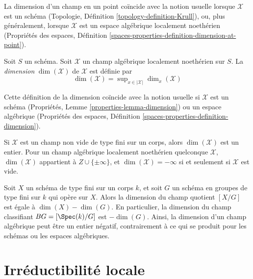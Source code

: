 \noindent
La dimension d'un champ en un point coïncide avec la notion usuelle
lorsque $\mathcal{X}$ est un schéma (Topologie, Définition
\ref{topology-definition-Krull}),
ou, plus généralement, lorsque $\mathcal{X}$ est un espace algébrique localement noethérien
(Propriétés des espaces, Définition
\ref{spaces-properties-definition-dimension-at-point}).

\begin{definition}
\label{definition-dimension}
Soit $S$ un schéma. Soit $\mathcal{X}$
un champ algébrique localement noethérien sur $S$.
La {\it dimension} $\dim(\mathcal{X})$ de $\mathcal{X}$ est définie par
$$
\dim(\mathcal{X}) = \sup\nolimits_{x \in |\mathcal{X}|} \dim_x(\mathcal{X})
$$
\end{definition}

\noindent
Cette définition de la dimension coïncide avec la notion usuelle
si $\mathcal{X}$ est un schéma
(Propriétés, Lemme \ref{properties-lemma-dimension})
ou un espace algébrique (Propriétés des espaces, Définition
\ref{spaces-properties-definition-dimension}).

\begin{remark}
\label{remark-dimension-empty-stack}
Si $\mathcal{X}$ est un champ non vide de type fini sur un corps,
alors $\dim(\mathcal{X})$ est un entier. Pour un champ algébrique
localement noethérien quelconque $\mathcal{X}$,
$\dim(\mathcal{X})$ appartient à $Z\cup \{\pm \infty\}$,
et $\dim(\mathcal{X}) = -\infty$ si et seulement si $\mathcal{X}$
est vide.
\end{remark}

\begin{example}
\label{example-dimension-quotient-stack}
Soit $X$ un schéma de type fini sur un corps $k$, et soit $G$
un schéma en groupes de type fini sur $k$ qui opère sur $X$.
Alors la dimension du champ quotient $[X/G]$ est égale à
$\dim(X)-\dim(G)$. En particulier, la dimension du champ classifiant
$BG=[\Spec(k)/G]$ est $-\dim(G)$. Ainsi, la dimension d'un champ algébrique
peut être un entier négatif, contrairement à ce qui se produit pour les schémas
ou les espaces algébriques.
\end{example}






\section{Irréductibilité locale}
\label{section-irreducible-local-ring}

